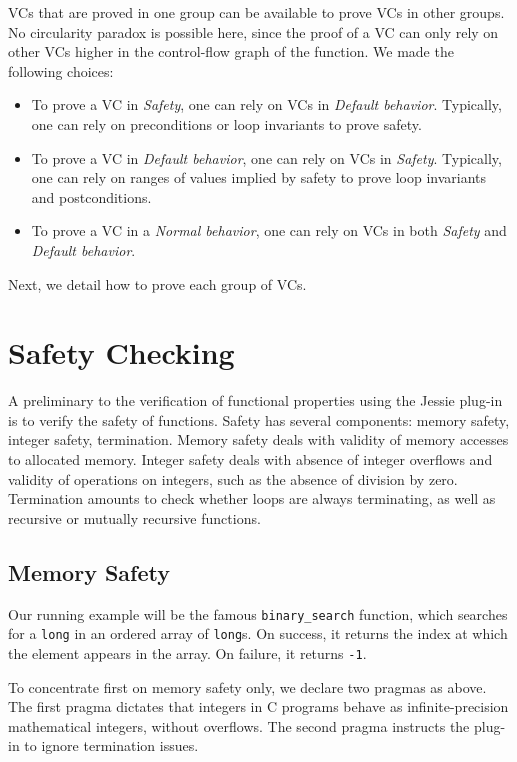 \documentclass[a4paper,11pt,twoside,openright]{report}
\begin{document}
VCs that are proved in one group can be available to prove VCs in other
groups. No circularity paradox is possible here, since the proof of a
VC can only rely on other VCs higher in the control-flow graph of the
function. We made the following choices:

\begin{itemize}
\item To prove a VC in \textit{Safety}, one can rely on VCs in
  \textit{Default behavior}. Typically, one can rely on preconditions
  or loop invariants to prove safety.
\item To prove a VC in \textit{Default behavior}, one can rely on VCs
  in \textit{Safety}. Typically, one can rely on ranges of values
  implied by safety to prove loop invariants and postconditions.
\item To prove a VC in a \textit{Normal behavior}, one can rely on VCs
  in both \textit{Safety} and \textit{Default behavior}.
\end{itemize}

Next, we detail how to prove each group of VCs.

\chapter{Safety Checking}

A preliminary to the verification of functional properties 
using the Jessie plug-in is to
verify the safety of functions. Safety has several components: memory
safety, integer safety, termination. Memory safety deals with validity
of memory accesses to allocated memory. Integer safety deals with
absence of integer overflows and validity of operations on integers,
such as the absence of division by zero. Termination amounts to check
whether loops are always terminating, as well as recursive or
mutually recursive functions.

\section{Memory Safety}

Our running example will be the famous \verb|binary_search| function,
which searches for a {\tt long} in an ordered array of {\tt long}s. On
success, it returns the index at which the element appears in the
array. On failure, it returns \verb|-1|.



To concentrate first on memory safety only, we declare two pragmas as
above. The first pragma dictates that integers in C programs behave as
infinite-precision mathematical integers, without overflows. The
second pragma instructs the plug-in to ignore termination issues.
\end{document}
